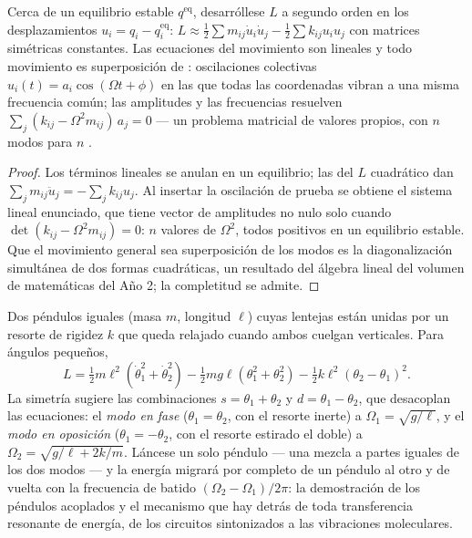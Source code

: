 \begin{proposition}\label{prop:b3:lagrangian-mechanics:modes}
Cerca de un equilibrio estable $q^{\text{eq}}$, desarróllese $L$ a segundo
orden en los desplazamientos $u_i = q_i - q_i^{\text{eq}}$:
$L \approx \tfrac12\sum m_{ij}\dot u_i\dot u_j -
\tfrac12\sum k_{ij}u_iu_j$ con matrices simétricas constantes. Las
ecuaciones del movimiento son lineales y todo movimiento es superposición de
\emph{}: oscilaciones colectivas $u_i(t) = a_i\cos(\Omega t
+ \phi)$ en las que todas las coordenadas vibran a una misma frecuencia
común; las amplitudes y las frecuencias resuelven $\sum_j(k_{ij} -
\Omega^2m_{ij})\,a_j = 0$ --- un problema matricial de valores propios, con
$n$ modos para $n$ .
\end{proposition}

\begin{proof}
Los términos lineales se anulan en un equilibrio; las  del $L$ cuadrático dan
$\sum_jm_{ij}\ddot u_j = -\sum_jk_{ij}u_j$. Al insertar la oscilación de
prueba se obtiene el sistema lineal enunciado, que tiene vector de
amplitudes no nulo solo cuando $\det(k_{ij} -
\Omega^2m_{ij}) = 0$: $n$ valores de $\Omega^2$, todos positivos en un
equilibrio estable. Que el movimiento general sea superposición de los modos
es la diagonalización simultánea de dos formas cuadráticas, un resultado del
álgebra lineal del volumen de matemáticas del Año 2; la completitud se
admite.
\end{proof}

\begin{example}\label{ex:b3:lagrangian-mechanics:coupled}
Dos péndulos iguales (masa $m$, longitud $\ell$) cuyas lentejas están unidas
por un resorte de rigidez $k$ que queda relajado cuando ambos cuelgan
verticales. Para ángulos pequeños,
\[
L = \tfrac12 m\ell^2(\dot\theta_1^2 + \dot\theta_2^2)
 - \tfrac12 mg\ell(\theta_1^2 + \theta_2^2)
 - \tfrac12 k\ell^2(\theta_2 - \theta_1)^2 .
\]
La simetría sugiere las combinaciones $s = \theta_1 + \theta_2$ y $d =
\theta_1 - \theta_2$, que desacoplan las ecuaciones: el \emph{modo en fase}
($\theta_1 = \theta_2$, con el resorte inerte) a $\Omega_1 =
\sqrt{g/\ell}$, y el \emph{modo en oposición} ($\theta_1 = -\theta_2$, con
el resorte estirado el doble) a $\Omega_2 = \sqrt{g/\ell + 2k/m}$. Láncese un
solo péndulo --- una mezcla a partes iguales de los dos modos --- y la
energía migrará por completo de un péndulo al otro y de vuelta con la
frecuencia de batido $(\Omega_2 - \Omega_1)/2\pi$: la demostración de los
péndulos acoplados y el mecanismo que hay detrás de toda transferencia
resonante de energía, de los circuitos sintonizados a las vibraciones
moleculares.
\end{example}

